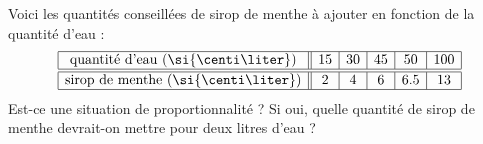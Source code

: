 
\begin{exercice}\label{exo2smath-0118}

    Voici les quantités conseillées de sirop de menthe à ajouter en fonction de la quantité d'eau :
    \begin{equation*}
        \begin{array}[]{|c||c|c|c|c|c|}
            \hline
            \text{quantité d'eau (\si{\centi\liter})}&15&30&45&50&100\\
              \hline\hline
              \text{sirop de menthe (\si{\centi\liter})}&2&4&6&6.5&13\\ 
              \hline 
               \end{array}
     \end{equation*}
     Est-ce une situation de proportionnalité ? Si oui, quelle quantité de sirop de menthe devrait-on mettre pour deux litres d'eau ?
           

\end{exercice}
